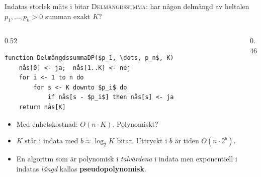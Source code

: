 \documentclass[aspectratio=169,10pt]{beamer}
\newcommand{\prob}[1]{\textsc{#1}}
\begin{document}
\begin{frame}[fragile]{Indatas storlek mäts i bitar}
  \prob{Delmängdssumma}: har någon delmängd av heltalen $p_1,\dots,p_n>0$ summan exakt $K$?
  \begin{columns}[T]
    \begin{column}{0.52\textwidth}
\begin{lstlisting}
function DelmängdssummaDP($p_1, \dots, p_n$, K)
    nås[0] <- ja;  nås[1..K] <- nej
    for i <- 1 to n do
        for s <- K downto $p_i$ do
            if nås[s - $p_i$] then nås[s] <- ja
    return nås[K]
\end{lstlisting}
      \begin{itemize}
        \item<2-> Med enhetskostnad: $O(n\cdot K)$. Polynomiskt?
        \item<3-> $K$ står i indata med $b\approx\log_2 K$ bitar. Uttryckt i $b$ är tiden $O(n\cdot 2^b)$.
        \item<4-> En algoritm som är polynomisk i \emph{talvärdena} i indata men exponentiell i indatas \emph{längd} kallas \textbf{pseudopolynomisk}.
      \end{itemize}
    \end{column}
    \begin{column}{0.46\textwidth}
      \centering

      \vspace{1mm}
\end{column}
\end{columns}
\end{frame}
\end{document}
